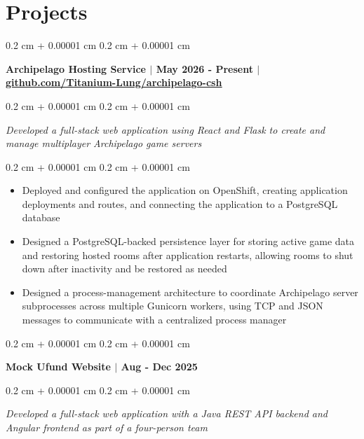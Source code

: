 \documentclass[10pt, letterpaper]{article}
\newenvironment{highlights}{
    \begin{itemize}[
        topsep=0.10 cm,
        parsep=0.10 cm,
        partopsep=0pt,
        itemsep=0pt,
        leftmargin=0.4 cm + 10pt
    ]
}{
    \end{itemize}
} %
\newenvironment{onecolentry}{
    \begin{adjustwidth}{
        0.2 cm + 0.00001 cm
    }{
        0.2 cm + 0.00001 cm
    }
}{
    \end{adjustwidth}
} %
\let\hrefWithoutArrow\href
\renewcommand{\href}[2]{\hrefWithoutArrow{#1}{\ifthenelse{\equal{#2}{}}{ }{#2 }\raisebox{.15ex}{\footnotesize \faExternalLink*}}}
\begin{document}
    \section{Projects} 
        \begin{onecolentry}
            \textbf{Archipelago Hosting Service $|$ May 2026 - Present $|$ \hrefWithoutArrow{https://github.com/Titanium-Lung/archipelago-csh}{\color{black}\underline{github.com/Titanium-Lung/archipelago-csh}}}
        \end{onecolentry}

        \vspace{0.10 cm}
        
        \begin{onecolentry}
            \textit{Developed a full-stack web application using React and Flask to create and manage multiplayer Archipelago game servers}
        \end{onecolentry}

        \vspace{0.10 cm}
        \begin{onecolentry}
            \begin{highlights}
                \item Deployed and configured the application on OpenShift, creating application deployments and routes, and connecting the application to a PostgreSQL database
                \item Designed a PostgreSQL-backed persistence layer for storing active game data and restoring hosted rooms after application restarts, allowing rooms to shut down after inactivity and be restored as needed
                \item Designed a process-management architecture to coordinate Archipelago server subprocesses across multiple Gunicorn workers, using TCP and JSON messages to communicate with a centralized process manager
            \end{highlights}
        \end{onecolentry}
        
        \vspace{0.2 cm}

	\begin{onecolentry}
            \textbf{Mock Ufund Website $|$ Aug - Dec 2025} 
        \end{onecolentry}

        \vspace{0.10 cm}
        
        \begin{onecolentry}
            \textit{Developed a full-stack web application with a Java REST API backend and Angular frontend as part of a four-person team}
        \end{onecolentry}
\end{document}
